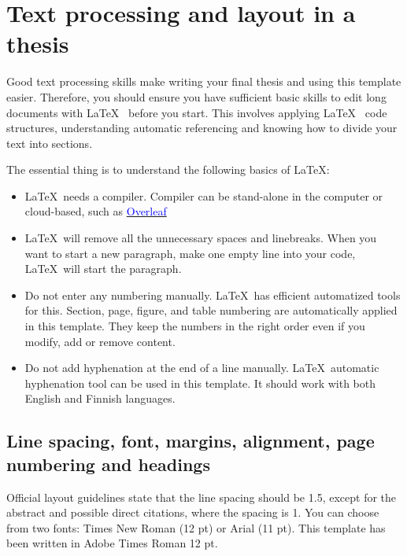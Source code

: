 \section{Text processing and layout in a thesis}\label{App:A}

Good text processing skills make writing your final thesis and using this template easier. Therefore, you should ensure you have sufficient basic skills to edit long documents with \LaTeX~ before you start. This involves applying \LaTeX~ code structures, understanding automatic referencing and knowing how to divide your text into sections. 

The essential thing is to understand the following basics of \LaTeX:

\begin{itemize}
    \item \LaTeX~needs a compiler. Compiler can be stand-alone in the computer or cloud-based, such as \href{https://www.overleaf.com/}{\textcolor{blue}{Overleaf}}
    \item \LaTeX~will remove all the unnecessary spaces and linebreaks. When you want to start a new paragraph, make one empty line into your code, \LaTeX~will start the paragraph.
    \item Do not enter any numbering manually. \LaTeX~has efficient automatized tools for this. Section, page, figure, and table numbering are automatically applied in this template. They keep the numbers in the right order even if you modify, add or remove content.
    \item Do not add hyphenation at the end of a line manually. \LaTeX~automatic hyphenation tool can be used in this template. It should work with both English and Finnish languages.
\end{itemize}

\subsection*{Line spacing, font, margins, alignment, page numbering and headings}

Official layout guidelines state that the line spacing should be 1.5, except for the abstract and possible direct citations, where the spacing is 1. You can choose from two fonts: Times New Roman (12 pt) or Arial (11 pt). This template has been written in Adobe Times Roman 12 pt.

